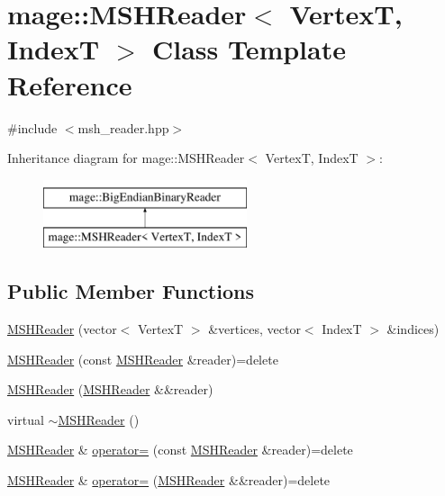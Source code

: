 \hypertarget{classmage_1_1_m_s_h_reader}{}\section{mage\+:\+:M\+S\+H\+Reader$<$ VertexT, IndexT $>$ Class Template Reference}
\label{classmage_1_1_m_s_h_reader}


{\ttfamily \#include $<$msh\+\_\+reader.\+hpp$>$}

Inheritance diagram for mage\+:\+:M\+S\+H\+Reader$<$ VertexT, IndexT $>$\+:\begin{figure}[H]
\begin{center}
\leavevmode
\includegraphics[height=2.000000cm]{classmage_1_1_m_s_h_reader}
\end{center}
\end{figure}
\subsection*{Public Member Functions}
\begin{DoxyCompactItemize}
\item 
\hyperlink{classmage_1_1_m_s_h_reader_af1254630a9770015c7b62d88eb5251bb}{M\+S\+H\+Reader} (vector$<$ VertexT $>$ \&vertices, vector$<$ IndexT $>$ \&indices)
\item 
\hyperlink{classmage_1_1_m_s_h_reader_aa33b8f059752b9aa321e8d227fe811bd}{M\+S\+H\+Reader} (const \hyperlink{classmage_1_1_m_s_h_reader}{M\+S\+H\+Reader} \&reader)=delete
\item 
\hyperlink{classmage_1_1_m_s_h_reader_a3c34d4fed2a717a2589dff1609f7c8b4}{M\+S\+H\+Reader} (\hyperlink{classmage_1_1_m_s_h_reader}{M\+S\+H\+Reader} \&\&reader)
\item 
virtual \hyperlink{classmage_1_1_m_s_h_reader_a6e1f882fa81362f744f438a1f992b182}{$\sim$\+M\+S\+H\+Reader} ()
\item 
\hyperlink{classmage_1_1_m_s_h_reader}{M\+S\+H\+Reader} \& \hyperlink{classmage_1_1_m_s_h_reader_abbe36c0fcfbf0c909a45f974c34ecc3a}{operator=} (const \hyperlink{classmage_1_1_m_s_h_reader}{M\+S\+H\+Reader} \&reader)=delete
\item 
\hyperlink{classmage_1_1_m_s_h_reader}{M\+S\+H\+Reader} \& \hyperlink{classmage_1_1_m_s_h_reader_a0f014d780eaa5477aa7206db51fede2f}{operator=} (\hyperlink{classmage_1_1_m_s_h_reader}{M\+S\+H\+Reader} \&\&reader)=delete
\end{DoxyCompactItemize}
